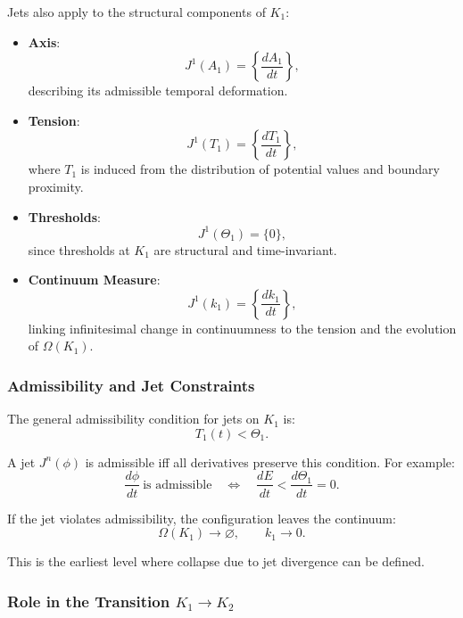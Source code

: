 Jets also apply to the structural components of $K_1$:

\begin{itemize}
    \item \textbf{Axis}:
    \[
    J^1(A_1) = \left\{\frac{dA_1}{dt}\right\},
    \]
    describing its admissible temporal deformation.

    \item \textbf{Tension}:
    \[
    J^1(T_1) = \left\{\frac{dT_1}{dt}\right\},
    \]
    where $T_1$ is induced from the distribution of potential values and
    boundary proximity.

    \item \textbf{Thresholds}:
    \[
    J^1(\Theta_1)=\{0\},
    \]
    since thresholds at $K_1$ are structural and time-invariant.

    \item \textbf{Continuum Measure}:
    \[
    J^1(k_1) = \left\{ \frac{dk_1}{dt} \right\},
    \]
    linking infinitesimal change in continuumness to the tension and the
    evolution of $\Omega(K_1)$.
\end{itemize}



\subsubsection{Admissibility and Jet Constraints}

The general admissibility condition for jets on $K_1$ is:
\[
T_1(t) < \Theta_1.
\]

A jet $J^n(\phi)$ is admissible iff all derivatives preserve this
condition. For example:
\[
\frac{d\phi}{dt} \ \text{is admissible}
\quad\Longleftrightarrow\quad
\frac{dE}{dt} < \frac{d\Theta_1}{dt} = 0.
\]

If the jet violates admissibility, the configuration leaves the
continuum:
\[
\Omega(K_1) \to \varnothing,
\qquad
k_1 \to 0.
\]

This is the earliest level where collapse due to jet divergence can be
defined.



\subsubsection{Role in the Transition \texorpdfstring{\texorpdfstring{$K_1\to K_2$}{K_1\to K_2}}{K1→K2}}

